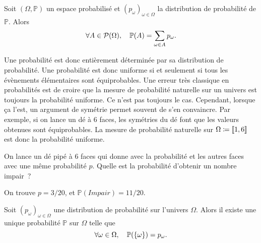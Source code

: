 \documentclass{magnolia}
\begin{document}
\begin{proposition}
Soit $(\Omega,\mathbb{P})$ un espace probabilisé et $(p_\omega)_{\omega\in\Omega}$ la distribution de probabilité de $\mathbb{P}$. Alors
\[\forall A\in\mathcal{P}(\Omega),\quad \mathbb{P}(A)=\sum_{\omega\in A} p_{\omega}.\]
\end{proposition}

\begin{remarques}
\remarque Une probabilité est donc entièrement déterminée par sa distribution de probabilité.
\remarque Une probabilité est donc uniforme si et seulement si tous les évènements élémentaires sont équiprobables.
Une erreur très classique en probabilités est de croire que la mesure de probabilité \og naturelle \fg
sur un univers est toujours la probabilité uniforme. Ce n'est pas toujours le cas. Cependant, lorsque ça l'est,
un argument de symétrie permet souvent de s'en convaincre.
Par exemple, si on lance un dé à 6 faces, les symétries du dé font que les valeurs obtenues sont
équiprobables. La mesure de probabilité \og naturelle \fg sur $\Omega\coloneqq\left\llbracket 1,6\right\rrbracket$ est donc la probabilité
uniforme.
\end{remarques}

\begin{exoUnique}
\exo On lance un dé pipé à 6 faces qui donne  \fg avec la probabilité  et les
  autres faces avec une même probabilité $p$. Quelle est la probabilité d'obtenir un nombre impair~?
  \begin{sol}
  On trouve $p=3/20$, et $\mathbb{P}(Impair)=11/20$.
  \end{sol}
\end{exoUnique}

\begin{proposition}
Soit $(p_\omega)_{\omega\in\Omega}$ une distribution de probabilité sur l'univers $\Omega$. Alors il existe une
unique probabilité $\mathbb{P}$ sur $\Omega$ telle que
\[\forall \omega\in\Omega,\quad \mathbb{P}(\left\{\omega\right\})=p_{\omega}.\]
\end{proposition}
\end{document}
